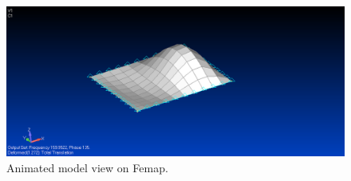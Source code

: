 \begin{figure}[ht]
    \centering
    \includegraphics[scale=0.5]{figures/animated-model.png}
    \caption{Animated model view on Femap.}
    \label{fig:deform}
\end{figure}



